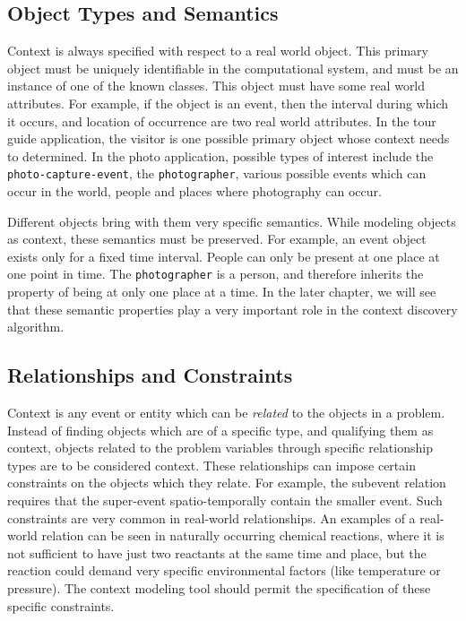 
\subsection{Object Types and Semantics}
Context is always specified with respect to a real world object. This primary object must be uniquely identifiable in the computational system, and must be an instance of one of the known classes. This object must have some real world attributes. For example, if the object is an event, then the interval during which it occurs, and location of occurrence are two real world attributes. In the tour guide application, the visitor is one possible primary object whose context needs to determined. In the photo application, possible types of interest include the \texttt{photo-capture-event}, the \texttt{photographer}, various possible events which can occur in the world, people and places where photography can occur.

Different objects bring with them very specific semantics. While modeling objects as context, these semantics must be preserved. For example, an event object exists only for a fixed time interval. People can only be present at one place at one point in time. The \texttt{photographer} is a person, and therefore inherits the property of being at only one place at a time. In the later chapter, we will see that these semantic properties play a very important role in the context discovery algorithm.

\subsection{Relationships and Constraints}
Context is any event or entity which can be \textit{related} to the objects in a problem. Instead of finding objects which are of a specific type, and qualifying them as context, objects related to the problem variables through specific relationship types are to be considered context. These relationships can impose certain constraints on the objects which they relate. For example, the subevent relation requires that the super-event spatio-temporally contain the smaller event. Such constraints are very common in real-world relationships. An examples of a real-world relation can be seen in naturally occurring chemical reactions, where it is not sufficient to have just two reactants at the same time and place, but the reaction could demand very specific environmental factors (like temperature or pressure). The context modeling tool  should permit the specification of these specific constraints.

